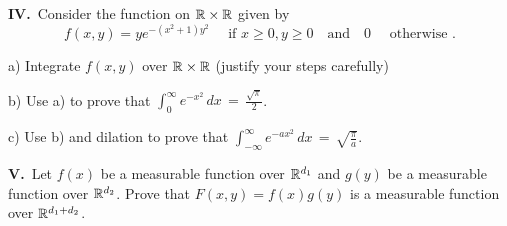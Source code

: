 \medskip
{\bf IV.\,}   Consider the function on $\Bbb R \times \Bbb R$ given by 
$$f(x, y) =  y e^{-(x^2 +1) y^2}\quad \text{ if }   x \geq 0, y \geq 0 \quad \text{and} \quad  0 \quad \text{ otherwise }.$$

a) Integrate $f(x,y)$ over $\Bbb R \times \Bbb R$   (justify your steps carefully)

b) Use a) to prove that $\int_0^\infty  e^{-x^2} \, d x \, =\, \frac{\sqrt{\pi}}{2}$.

c) Use b) and dilation to prove that $\int_{-\infty}^\infty  e^{- a x^2} \, d x \, =\, \sqrt{\frac{\pi}{a}}$.

\medskip

{\bf V.\,}  Let $f(x)$ be a measurable function over $\Bbb R^{d_1}$ and $g(y)$  be a measurable function over $\Bbb R^{d_2}$. Prove that $F(x,y) = f(x) g(y) $ is a measurable function over $\Bbb R^{d_1 + d_2}$.



 \enddocument



                                               













